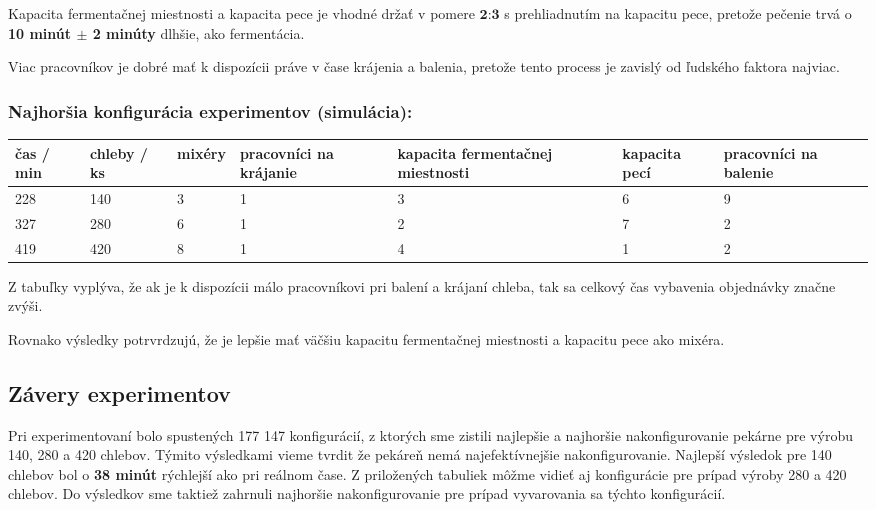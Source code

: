 \documentclass[a4paper, 10pt]{article}
\begin{document}
    Kapacita fermentačnej miestnosti a kapacita pece
    je vhodné držať v pomere $\textbf{2:3}$ s prehliadnutím na kapacitu pece, pretože
    pečenie trvá o \textbf{10 minút $\pm$ 2 minúty} dlhšie, ako fermentácia.

    Viac pracovníkov je dobré mať k dispozícii práve v čase krájenia a balenia, pretože
    tento process je zavislý od ľudského faktora najviac.

    \subsubsection{Najhoršia konfigurácia experimentov (simulácia):}
    \begin{center}
        \begin{tabular}{ |p{2cm}|p{2cm}|p{2cm}|p{2cm}|p{2cm}|p{2cm}|p{2cm}| }
            \hline
            čas / min & chleby / ks & mixéry & pracovníci na krájanie & kapacita fermentačnej miestnosti & kapacita pecí & pracovníci na balenie \\
            \hline\hline
            228       & 140         & 3      & 1                      & 3                                & 6             & 9                     \\ \hline
            327       & 280         & 6      & 1                      & 2                                & 7             & 2                     \\ \hline
            419       & 420         & 8      & 1                      & 4                                & 1             & 2                     \\ \hline
        \end{tabular}
    \end{center}

    Z tabuľky vyplýva, že ak je k dispozícii málo pracovníkovi pri balení a krájaní
    chleba, tak sa celkový čas vybavenia objednávky značne zvýši.

    Rovnako výsledky potrvrdzujú, že je lepšie mať väčšiu kapacitu fermentačnej miestnosti
    a kapacitu pece ako mixéra.

    \subsection{Závery experimentov}
    Pri experimentovaní bolo spustených 177 147 konfigurácií, z ktorých sme zistili najlepšie a najhoršie nakonfigurovanie
    pekárne pre výrobu 140, 280 a 420 chlebov. Týmito výsledkami vieme tvrdit že pekáreň nemá najefektívnejšie nakonfigurovanie.
    Najlepší výsledok pre 140 chlebov bol o \textbf{38 minút} rýchlejší ako pri reálnom čase. Z priložených tabuliek
    môžme vidieť aj konfigurácie pre prípad výroby 280 a 420 chlebov. Do výsledkov sme taktiež zahrnuli najhoršie nakonfigurovanie
    pre prípad vyvarovania sa týchto konfigurácií.
\end{document}
